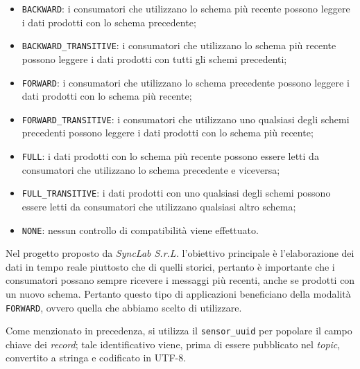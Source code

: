 \begin{itemize}
	\item \texttt{BACKWARD}: i consumatori che utilizzano lo schema più recente possono leggere i dati prodotti con lo schema precedente;
	\item \texttt{BACKWARD\_TRANSITIVE}: i consumatori che utilizzano lo schema più recente possono leggere i dati prodotti con tutti gli schemi precedenti;
	\item \texttt{FORWARD}: i consumatori che utilizzano lo schema precedente possono leggere i dati prodotti con lo schema più recente;
	\item \texttt{FORWARD\_TRANSITIVE}: i consumatori che utilizzano uno qualsiasi degli schemi precedenti possono leggere i dati prodotti con lo schema più recente;
	\item \texttt{FULL}: i dati prodotti con lo schema più recente possono essere letti da consumatori che utilizzano lo schema precedente e viceversa;
	\item \texttt{FULL\_TRANSITIVE}: i dati prodotti con uno qualsiasi degli schemi possono essere letti da consumatori che utilizzano qualsiasi altro schema;
	\item \texttt{NONE}: nessun controllo di compatibilità viene effettuato.
\end{itemize}
Nel progetto proposto da \textit{SyncLab S.r.L.} l'obiettivo principale è l'elaborazione dei dati in tempo reale piuttosto che di quelli storici, pertanto
è importante che i consumatori possano sempre ricevere i messaggi più recenti, anche se prodotti con un nuovo schema. Pertanto questo tipo di applicazioni beneficiano
della modalità \texttt{FORWARD}, ovvero quella che abbiamo scelto di utilizzare.

Come menzionato in precedenza, si utilizza il \texttt{sensor\_uuid} per popolare il campo chiave dei \textit{record}; tale identificativo viene, prima di essere pubblicato
nel \textit{topic}, convertito a stringa e codificato in UTF-8.

